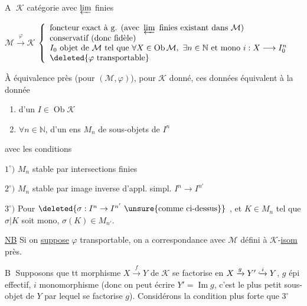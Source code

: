 \textcircled{A} $\mathcal K$ catégorie avec $\varprojlim$ finies

$\mathcal M\xrightarrow{\varphi}\mathcal K$
$\left\{\begin{array}{l}
\text{foncteur exact à g. (avec }\varprojlim\text{ finies existant dans }\mathcal M)\\
\text{conservatif (donc fidèle)}\\
I_0\text{ objet de }\mathcal M\text{ tel que }\forall X\in\operatorname{Ob}\mathcal M,\ \exists n\in\mathbb N
\text{ et mono }i:X\longrightarrow I_0^n\\
\deleted{\varphi\text{ transportable}}
\end{array}\right.$

À équivalence près (pour $(\mathcal M,\varphi)$), pour $\mathcal K$ donné, ces données équivalent à la donnée
\begin{enumerate}
\item[a)] d'un $I\in\operatorname{Ob}\mathcal K$
\item[b)] $\forall n\in\mathbb N$, d'un ens $M_n$ de sous-objets de $I^n$
\end{enumerate}
avec les conditions

$1^\circ)$ $M_n$ stable par intersections finies

$2^\circ)$ $M_n$ stable par image inverse d'appl. simpl. $I^n\to I^{n'}$

$3^\circ)$ Pour $\deleted{\sigma:I^n\to I^{n'}\ \unsure{\text{comme ci-dessus}}}$ , et $K\in M_n$ tel que $\sigma|K$ soit mono, $\sigma(K)\in M_{n'}$.

\uline{NB} Si on \uline{suppose} $\varphi$ transportable, on a correspondance avec $\mathcal M$ défini à $\mathcal K$-\uline{isom} près.

\textcircled{B} Supposons que tt morphisme $X\xrightarrow{f}Y$ de $\mathcal K$ se factorise en $X\xrightarrow{g}Y'\lhook\joinrel\xrightarrow{i}Y$, $g$ épi effectif, $i$ monomorphisme (donc on peut écrire $Y'=\operatorname{Im}g$, c'est le plus petit sous-objet de $Y$ par lequel se factorise $g$).
Considérons la condition plus forte que $3^\circ$

